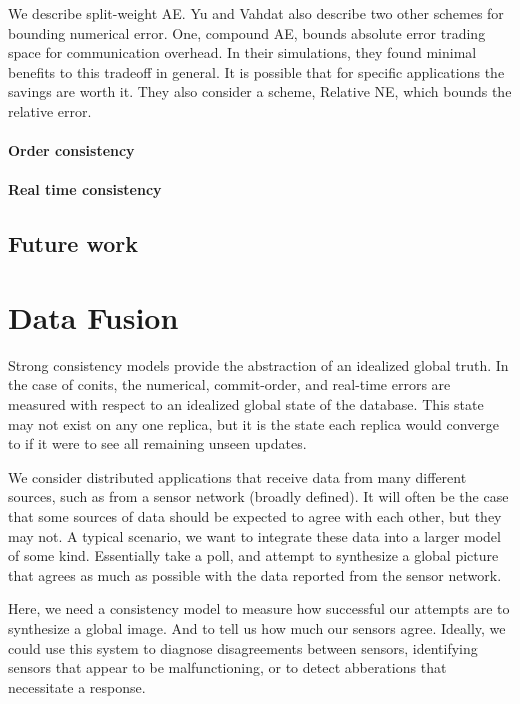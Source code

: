 \documentclass[]             %
{NASA}                       %
\theoremstyle{definition}
\begin{document}
We describe split-weight AE. Yu and Vahdat also describe two other
schemes for bounding numerical error. One, compound AE, bounds absolute
error trading space for communication overhead. In their simulations,
they found minimal benefits to this tradeoff in general. It is possible
that for specific applications the savings are worth it. They also
consider a scheme, Relative NE, which bounds the relative error.

\hypertarget{order-consistency-1}{%
\paragraph{Order consistency}\label{order-consistency-1}}

\hypertarget{real-time-consistency-1}{%
\paragraph{Real time consistency}\label{real-time-consistency-1}}

\hypertarget{future-work}{%
\subsection{Future work}\label{future-work}}

\hypertarget{data-fusion}{%
\section{Data Fusion}\label{data-fusion}}

\label{sec:data-fusion}

Strong consistency models provide the abstraction of an idealized global
truth. In the case of conits, the numerical, commit-order, and real-time
errors are measured with respect to an idealized global state of the
database. This state may not exist on any one replica, but it is the
state each replica would converge to if it were to see all remaining
unseen updates.

We consider distributed applications that receive data from many
different sources, such as from a sensor network (broadly defined). It
will often be the case that some sources of data should be expected to
agree with each other, but they may not. A typical scenario, we want to
integrate these data into a larger model of some kind. Essentially take
a poll, and attempt to synthesize a global picture that agrees as much
as possible with the data reported from the sensor network.

Here, we need a consistency model to measure how successful our attempts
are to synthesize a global image. And to tell us how much our sensors
agree. Ideally, we could use this system to diagnose disagreements
between sensors, identifying sensors that appear to be malfunctioning,
or to detect abberations that necessitate a response.
\end{document}
